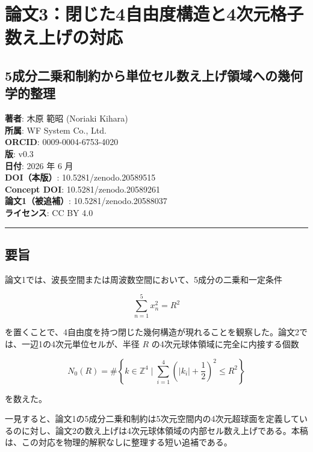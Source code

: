 \documentclass[
]{ltjsarticle}
\author{}
\date{}
\begin{document}
\section{論文3：閉じた4自由度構造と4次元格子数え上げの対応}\label{ux8ad6ux65873ux9589ux3058ux305f4ux81eaux7531ux5ea6ux69cbux9020ux30684ux6b21ux5143ux683cux5b50ux6570ux3048ux4e0aux3052ux306eux5bfeux5fdc}

\subsection{5成分二乗和制約から単位セル数え上げ領域への幾何学的整理}\label{ux6210ux5206ux4e8cux4e57ux548cux5236ux7d04ux304bux3089ux5358ux4f4dux30bbux30ebux6570ux3048ux4e0aux3052ux9818ux57dfux3078ux306eux5e7eux4f55ux5b66ux7684ux6574ux7406}

\textbf{著者}: 木原 範昭 (Noriaki Kihara)\\
\textbf{所属}: WF System Co., Ltd.\\
\textbf{ORCID}: 0009-0004-6753-4020\\
\textbf{版}: v0.3\\
\textbf{日付}: 2026 年 6 月\\
\textbf{DOI（本版）}: 10.5281/zenodo.20589515\\
\textbf{Concept DOI}: 10.5281/zenodo.20589261\\
\textbf{論文1（被追補）}: 10.5281/zenodo.20588037\\
\textbf{ライセンス}: CC BY 4.0

\begin{center}\rule{0.5\linewidth}{0.5pt}\end{center}

\subsection{要旨}\label{ux8981ux65e8}

論文1では、波長空間または周波数空間において、5成分の二乗和一定条件

\[
\sum_{n=1}^{5}x_n^2=R^2
\]

を置くことで、4自由度を持つ閉じた幾何構造が現れることを観察した。論文2では、一辺1の4次元単位セルが、半径
\(R\) の4次元球体領域に完全に内接する個数

\[
N_0(R)
=
\#\left\{
k\in\mathbb{Z}^4
\mid
\sum_{i=1}^{4}
\left(|k_i|+\frac12\right)^2
\le R^2
\right\}
\]

を数えた。

一見すると、論文1の5成分二乗和制約は5次元空間内の4次元超球面を定義しているのに対し、論文2の数え上げは4次元球体領域の内部セル数え上げである。本稿は、この対応を物理的解釈なしに整理する短い追補である。
\end{document}
